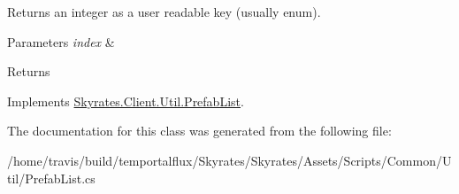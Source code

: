 Returns an integer as a user readable key (usually enum). 


\begin{DoxyParams}{Parameters}
{\em index} & \\
\hline
\end{DoxyParams}
\begin{DoxyReturn}{Returns}

\end{DoxyReturn}


Implements \hyperlink{class_skyrates_1_1_client_1_1_util_1_1_prefab_list_a462cb1bdd78ba22bd277874dc6b9239e}{Skyrates.\-Client.\-Util.\-Prefab\-List}.



The documentation for this class was generated from the following file\-:\begin{DoxyCompactItemize}
\item 
/home/travis/build/temportalflux/\-Skyrates/\-Skyrates/\-Assets/\-Scripts/\-Common/\-Util/Prefab\-List.\-cs\end{DoxyCompactItemize}
